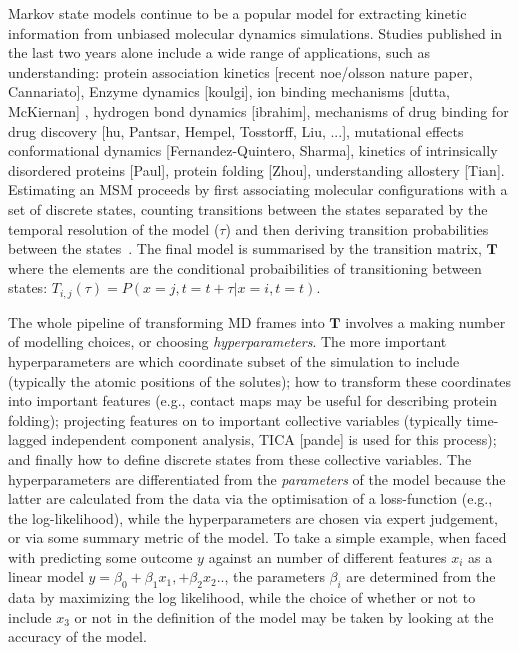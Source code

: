 \documentclass[journal=jacsat,manuscript=article]{achemso}
\begin{document}
Markov state models continue to be a popular model for extracting kinetic information from unbiased molecular dynamics simulations. Studies published in the last two years alone include a wide range of applications, such as understanding:  protein association kinetics [recent noe/olsson nature paper, Cannariato], Enzyme dynamics [koulgi], ion binding mechanisms  [dutta, McKiernan] , hydrogen bond dynamics [ibrahim], mechanisms of drug binding for drug discovery [hu, Pantsar, Hempel, Tosstorff, Liu, ...], mutational effects conformational dynamics [Fernandez-Quintero, Sharma], kinetics of intrinsically disordered proteins [Paul], protein folding [Zhou], understanding allostery [Tian].  Estimating an MSM proceeds by first associating molecular configurations with a set of discrete states,  counting transitions between the states separated by the temporal resolution of the model ($\tau$) and then deriving transition probabilities between the states~\cite{trendelkamp-schroer_estimation_2015}. The final model is summarised by the transition matrix, $\mathbf{T}$ where the elements are the conditional probaibilities of transitioning between states: $T_{i,j}(\tau) = P(x=j, t=t+\tau| x=i, t=t)$.  

The whole pipeline of transforming MD frames into $\mathbf{T}$ involves a making number of modelling choices, or choosing  \emph{hyperparameters}.  The more important hyperparameters are which coordinate subset of the simulation to include (typically the atomic positions of the solutes); how to transform these coordinates into important  features (e.g., contact maps may be useful for describing protein folding); projecting features on to important collective variables (typically time-lagged independent component analysis, TICA [pande] is used for this process); and finally how to define discrete states from these collective variables.  The hyperparameters are differentiated from the \emph{parameters} of the model because the latter are calculated from the data via the optimisation of a loss-function (e.g., the log-likelihood), while the hyperparameters are chosen via expert judgement, or via some summary metric of the model. To take a simple example, when faced with predicting some outcome $y$ against an number of different features $x_i$ as a linear model $y = \beta_0  + \beta_1 x_1, + \beta_2 x_2 ..$, the parameters $\beta_i$ are determined from the data by maximizing the log likelihood, while the choice of whether or not to include $x_3$ or not in the definition of the model may be taken by looking at the accuracy of the model.  
\end{document}
